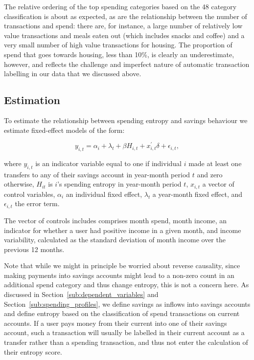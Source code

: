 The relative ordering of the top spending categories based on the 48 category
classification is about as expected, as are the relationship between the number
of transactions and spend: there are, for instance, a large number of
relatively low value transactions and meals eaten out (which includes snacks
and coffee) and a very small number of high value transactions for housing. The
proportion of spend that goes towards housing, less than 10\%, is clearly an
underestimate, however, and reflects the challenge and imperfect nature of
automatic transaction labelling in our data that we discussed above.

\subsection{Estimation}%
\label{sub:estimation}

To estimate the relationship between spending entropy and savings behaviour we
estimate fixed-effect models of the form: 

\begin{equation}
    \label{equ:model}
    y_{i,t} = \alpha_i + \lambda_t + \beta H_{i,t} + x^\prime_{i,t} \delta +
    \epsilon_{i,t},
\end{equation}

\noindent where $y_{i,t}$ is an indicator variable equal to one if individual
$i$ made at least one transfers to any of their savings account in year-month
period $t$ and zero otherwise, $H_{it}$ is $i$'s spending entropy in year-month
period $t$, $x_{i,t}$ a vector of control variables, $\alpha_i$ an individual
fixed effect, $\lambda_t$ a year-month fixed effect, and $\epsilon_{i, t}$ the
error term.

The vector of controls {\color{red} includes} {\color{blue} comprises} month spend, month income, an indicator for
whether a user had positive income in a given month, and income
variability, calculated as the standard deviation of month income over the
previous 12 months.

Note that while we might in principle be worried about reverse causality, since
making payments into savings accounts might lead to a non-zero count in an
additional spend category and thus change entropy, this is not a concern here.
As discussed in Section~\ref{sub:dependent_variables} and
Section~\ref{sub:spending_profiles}, we define savings as inflows into savings
accounts and define entropy based on the classification of spend transactions
on current accounts. If a user pays money from their current into one of their
savings account, such a transaction will usually be labelled in their current
account as a transfer rather than a spending transaction, and thus not enter
the calculation of their entropy score.

